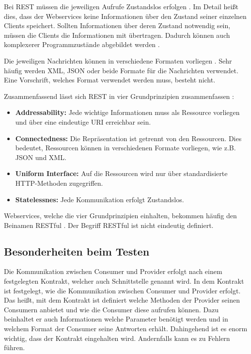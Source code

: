 \documentclass{llncs}
\begin{document}
Bei REST müssen die jeweiligen Aufrufe Zustandslos erfolgen \cite{reza2010framework, porres2011modeling, kao2013performance}. Im Detail heißt dies, dass der Webservices keine Informationen über den Zustand seiner einzelnen Clients speichert. Sollten Informationen über deren Zustand notwendig sein, müssen die Clients die Informationen mit übertragen. Dadurch können auch komplexerer Programmzustände abgebildet werden \cite{porres2011modeling}.

Die jeweiligen Nachrichten können in verschiedene Formaten vorliegen
\cite{reza2010framework}. Sehr häufig werden XML, JSON oder beide Formate für die Nachrichten verwendet. 
Eine Vorschrift, welches Format verwendet werden muss, besteht nicht.

Zusammenfassend lässt sich REST in vier Grundprinzipien zusammenfassen \citep{porres2011modeling}: 

\begin{itemize}
\item \textbf{Addressability: } Jede wichtige Informationen muss als Ressource vorliegen und über eine eindeutige URI erreichbar sein.
\item \textbf{Connectedness: } Die Repräsentation ist getrennt von den Ressourcen. Dies bedeutet, Ressourcen können in verschiedenen Formate vorliegen, wie z.B. JSON und XML.
\item \textbf{Uniform Interface: } Auf die Ressourcen wird nur über standardisierte HTTP-Methoden zugegriffen.
\item \textbf{Statelessnes: } Jede Kommunikation erfolgt Zustandslos.
\end{itemize}

Webservices, welche die vier Grundprinzipien einhalten, bekommen häufig den Beinamen RESTful \citep{porres2011modeling}. Der Begriff RESTful ist nicht eindeutig definiert.  

\subsection{Besonderheiten beim Testen}
Die Kommunikation zwischen Consumer und Provider erfolgt nach einem festgelegten Kontrakt, welcher auch Schnittstelle genannt wird. In dem Kontrakt ist festgelegt, wie die Kommunikation zwischen Consumer und Provider erfolgt. Das heißt, mit dem Kontrakt ist definiert welche Methoden der Provider seinen Consumern anbietet und wie die Consumer diese aufrufen können. Dazu beinhaltet er auch Informationen welche Parameter benötigt werden und in welchem Format der Consumer seine Antworten erhält. Dahingehend ist es enorm wichtig, dass der Kontrakt eingehalten wird. Andernfalls kann es zu Fehlern führen.
\end{document}
